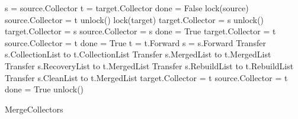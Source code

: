 \begin{algorithm}[H]
	\scriptsize
	
		\begin{algorithmic}[1]
\State s = source.Collector
\State t = target.Collector
\State  done = False
\State lock(source)
\State source.Collector = t
\State unlock()
\EndIf
{}
\State lock(target)
\State target.Collector = s
\State unlock()
\EndIf
{}
\EndIf
{}
\State target.Collector = s
\State source.Collector = s
\State done = True
\State target.Collector = t
\State source.Collector = t
\State done = True
\State t = t.Forward 
\State s = s.Forward 
\Else
\State Transfer s.CollectionList to t.CollectionList 
\State Transfer s.MergedList to t.MergedList 
\State Transfer s.RecoveryList to t.MergedList 
\State Transfer s.RebuildList to t.RebuildList 
\State Transfer s.CleanList to t.MergedList 
\State target.Collector = t
\State source.Collector = t
\State done = True
\EndIf
\State unlock()
\EndWhile
\EndProcedure
\caption{MergeCollectors}
\label{algorithm:mergecollectors}
\end{algorithmic}
\end{algorithm}

